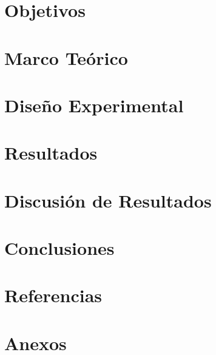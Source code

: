 \documentclass[12pt]{article}
\begin{document}
\section{Objetivos}

\section{Marco Teórico}

\section{Diseño Experimental}

\section{Resultados}

\section{Discusión de Resultados}

\section{Conclusiones}

\section{Referencias}

\section{Anexos}
\end{document}
